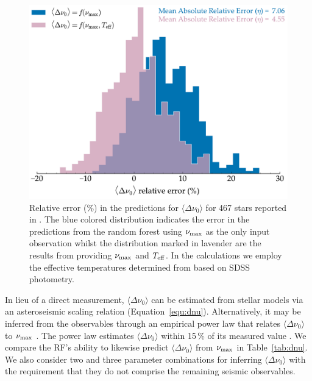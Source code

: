 \begin{figure}
\centering
\includegraphics[width=0.9\linewidth]{chaplin.pdf}
\caption[Relative error in predictions for $\Delta\nu$]{Relative error (\%) in the predictions for $\langle\Delta\nu_0\rangle$ for 467 stars reported in \citet{2014ApJS..210....1C}. The blue colored distribution indicates the error in the predictions from the random forest using $\nu_{\rm{max}}$ as the only input observation whilst the distribution marked in lavender are the results from providing $\nu_{\rm{max}}$ and $T_{\rm{eff}}$. In the calculations we employ the effective temperatures determined from \citet{2012ApJS..199...30P} based on  SDSS photometry.} 
\label{fig:chap}
\end{figure}

In lieu of a direct measurement, $\langle\Delta\nu_0\rangle$ can be estimated from stellar models via an asteroseismic scaling relation (Equation~\ref{equ:dnu}). Alternatively, it may be inferred from the observables through an empirical power law that relates $\langle\Delta\nu_0\rangle$ to $\nu_{\rm{max}}$ \citep{2009A&A...506..465H,2009MNRAS.400L..80S}. 
The power law estimates $\langle\Delta\nu_0\rangle$ within  15\,\% of its measured value \citep{2009MNRAS.400L..80S}.
We compare the RF's ability to likewise predict $\langle\Delta\nu_0\rangle$ from $\nu_{\rm{max}}$ in Table~\ref{tab:dnu}. We also consider two and three parameter combinations for inferring $\langle\Delta\nu_0\rangle$ with the requirement that they do not comprise the remaining seismic observables. 

